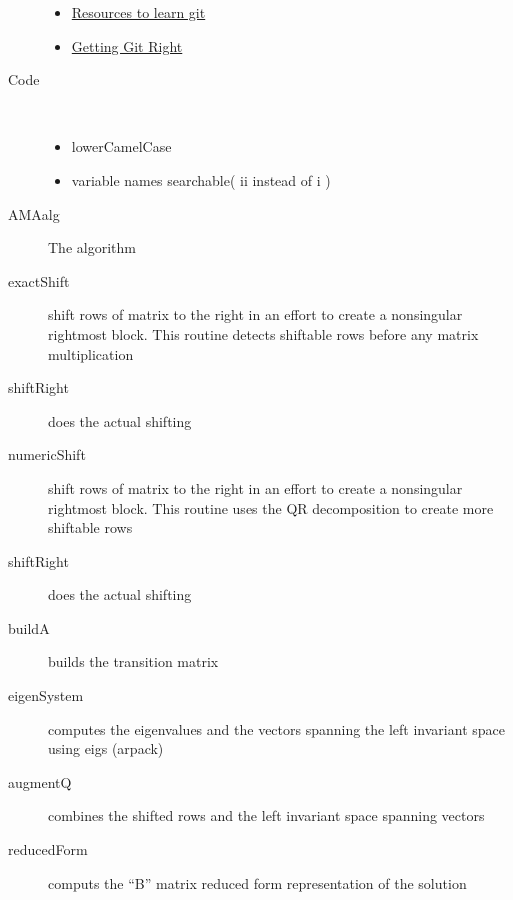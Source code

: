 \documentclass[12pt]{article}
\begin{document}
\begin{description}
  \begin{itemize}
  \item \href{https://try.github.io/}{Resources to learn git}
  \item \href{https://www.atlassian.com/git}{Getting Git Right}
  \end{itemize}

\item[Code] \
  
  \begin{itemize}
  \item lowerCamelCase
  \item variable names searchable( ii instead of i )
  \end{itemize}


\item[AMAalg] The algorithm

\item[exactShift] shift rows of matrix to the right in an effort to create a nonsingular rightmost block. This routine detects shiftable rows before any matrix multiplication
\item[shiftRight]  does the actual shifting 
\item[numericShift] shift rows of matrix to the right in an effort to create a nonsingular rightmost block. This routine uses the QR decomposition to create  more shiftable rows
\item[shiftRight] does the actual shifting 
\item[buildA] builds the transition matrix
\item[eigenSystem] computes the eigenvalues and the vectors spanning the left invariant space using eigs (arpack)
\item[augmentQ] combines the shifted rows and the left invariant space spanning vectors
\item[reducedForm] computs the ``B'' matrix reduced form representation of the solution



\end{description}
\end{document}
